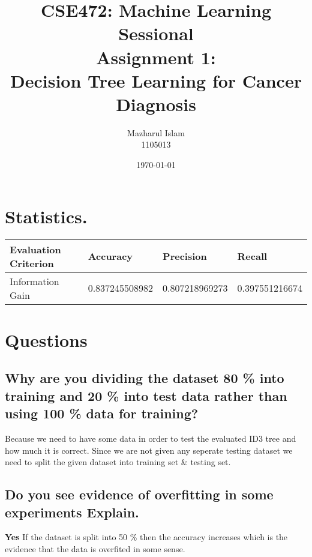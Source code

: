 \documentclass[11pt]{article}
\title{\textbf{CSE472: Machine Learning Sessional}\\Assignment 1:\\ Decision Tree Learning for Cancer
Diagnosis
}
\author{Mazharul Islam\\
		1105013
		}
\date{\today}
\begin{document}
\maketitle

\section{Statistics.}\begin{tabular}{|l|l|l|l|}
	\hline
		Evaluation Criterion &  Accuracy& Precision& Recall\\
	\hline
		Information Gain & 0.837245508982 & 0.807218969273 & 0.397551216674\\
	\hline
	\end{tabular}

\section{Questions}
	\subsection{Why are you dividing the dataset 80 \% into training and 20 \% into test data rather than using 100 \% data for training?}
		
	Because we need to have some data in order to test  the evaluated ID3 tree and  how much it is correct. Since we are not given any seperate testing dataset we need to split the given dataset into training set \& testing set.
	\subsection{Do you see evidence of overfitting in  some  experiments  Explain.}
	\textbf{Yes}
	If the dataset is split into 50 \% then the accuracy increases which is the evidence that the data is overfited in some sense. 
\end{document}
